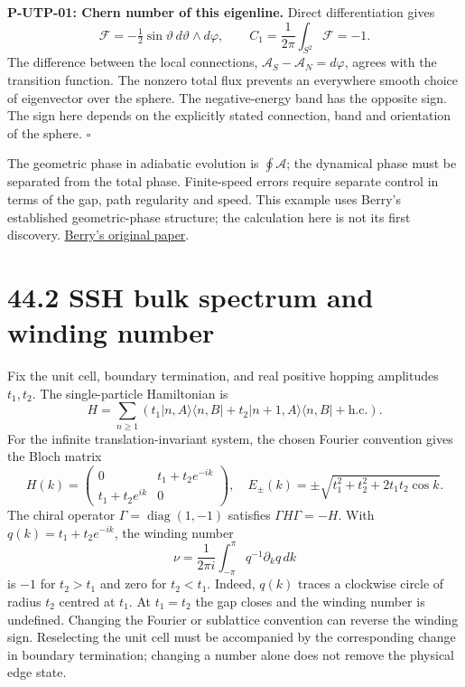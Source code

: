 \documentclass[
  11pt,
  oneside]{book}
\begin{document}
\label{p-utp-01}{}

\textbf{P-UTP-01: Chern number of this eigenline.} Direct
differentiation gives \[
\mathcal F=-\tfrac12\sin\vartheta\,d\vartheta\wedge d\varphi,
\qquad C_1=\frac1{2\pi}\int_{S^2}\mathcal F=-1.
\] The difference between the local connections,
\(\mathcal A_S-\mathcal A_N=d\varphi\), agrees with the transition
function. The nonzero total flux prevents an everywhere smooth choice of
eigenvector over the sphere. The negative-energy band has the opposite
sign. The sign here depends on the explicitly stated connection, band
and orientation of the sphere. \(\square\)

The geometric phase in adiabatic evolution is \(\oint\mathcal A\); the
dynamical phase must be separated from the total phase. Finite-speed
errors require separate control in terms of the gap, path regularity and
speed. This example uses Berry's established geometric-phase structure;
the calculation here is not its first discovery.
\href{https://doi.org/10.1098/rspa.1984.0023}{Berry's original paper}.

\section{44.2 SSH bulk spectrum and winding number}

Fix the unit cell, boundary termination, and real positive hopping
amplitudes \(t_1,t_2\). The single-particle Hamiltonian is \[
H=\sum_{n\ge1}(t_1|n,A\rangle\langle n,B|
+t_2|n+1,A\rangle\langle n,B|+\mathrm{h.c.}).
\] For the infinite translation-invariant system, the chosen Fourier
convention gives the Bloch matrix \[
H(k)=\begin{pmatrix}0&t_1+t_2e^{-ik}\\t_1+t_2e^{ik}&0\end{pmatrix},
\quad E_\pm(k)=\pm\sqrt{t_1^2+t_2^2+2t_1t_2\cos k}.
\] The chiral operator \(\Gamma=\operatorname{diag}(1,-1)\) satisfies
\(\Gamma H\Gamma=-H\). With \(q(k)=t_1+t_2e^{-ik}\), the winding number
\[
\nu=\frac{1}{2\pi i}\int_{-\pi}^{\pi}q^{-1}\partial_kq\,dk
\] is \(-1\) for \(t_2>t_1\) and zero for \(t_2<t_1\). Indeed, \(q(k)\)
traces a clockwise circle of radius \(t_2\) centred at \(t_1\). At
\(t_1=t_2\) the gap closes and the winding number is undefined. Changing
the Fourier or sublattice convention can reverse the winding sign.
Reselecting the unit cell must be accompanied by the corresponding
change in boundary termination; changing a number alone does not remove
the physical edge state.
\end{document}
